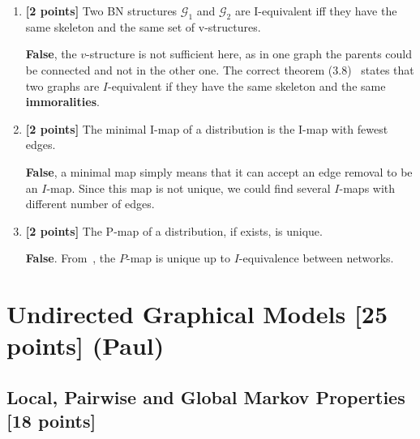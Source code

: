 \documentclass[12pt]{article} \usepackage[utf8]{inputenc}
\newcommand{\Gcal}{\mathcal{G}}
\begin{document}
\begin{enumerate}
\item \textbf{[2 points]} Two BN structures $ \Gcal_1 $ and $ \Gcal_2 $ are I-equivalent iff they have the same skeleton and the same set of v-structures.

\begin{solution}
  \textbf{False}, the $v$-structure is not sufficient here, as in one graph
  the parents could be connected and not in the other one. The correct
  theorem (3.8)~\cite{koller2009probabilistic} states that two graphs are
  $I$-equivalent if they have the same skeleton and the same
  \textbf{immoralities}.
\end{solution}

\item \textbf{[2 points]} The minimal I-map of a distribution is the I-map with fewest edges.

\begin{solution}
  \textbf{False}, a minimal map simply means that it can accept an edge
  removal to be an $I$-map. Since this map is not unique, we could find
  several $I$-maps with different number of edges. 
\end{solution}
\item \textbf{[2 points]} The P-map of a distribution, if exists, is unique. 
\begin{solution}
  \textbf{False}. From~\cite[page 84]{koller2009probabilistic}, the $P$-map
  is unique up to $I$-equivalence between networks.
\end{solution}
\end{enumerate}


\newpage


\section{Undirected Graphical Models [25 points] (Paul)}

\subsection{Local, Pairwise and Global Markov Properties [18 points]}
\end{document}
